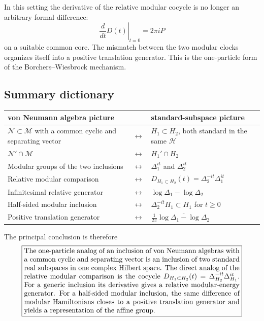 \documentclass[a4paper,11pt]{article}
\theoremstyle{definition}
\newcommand{\cH}{\mathcal{H}}
\begin{document}
In this setting the derivative of the relative modular cocycle is no
longer an arbitrary formal difference:
\[
\left.\frac{d}{dt}D(t)\right|_{t=0}
   =2\pi iP
\]
on a suitable common core.  The mismatch between the two modular clocks
organizes itself into a positive translation generator.  This is the
one-particle form of the Borchers--Wiesbrock mechanism.

\subsection*{Summary dictionary}

\renewcommand{\arraystretch}{1.45}
\setlength{\tabcolsep}{4pt}
\begin{center}
\begin{tabular}{>{\raggedright\arraybackslash}p{}
                >{\centering\arraybackslash}p{}
                >{\raggedright\arraybackslash}p{}}
\toprule
\textbf{von Neumann algebra picture}
& &
\textbf{standard-subspace picture}\\
\midrule
$\mathcal{N}\subset\mathcal{M}$ with a common cyclic and separating vector
& $\longleftrightarrow$ &
$H_1\subset H_2$, both standard in the same $\cH$\\
$\mathcal{N}'\cap\mathcal{M}$
& $\longleftrightarrow$ &
$H_1'\cap H_2$\\
Modular groups of the two inclusions
& $\longleftrightarrow$ &
$\Delta_1^{it}$ and $\Delta_2^{it}$\\
Relative modular comparison
& $\longleftrightarrow$ &
$D_{H_1\subset H_2}(t)=\Delta_2^{-it}\Delta_1^{it}$\\
Infinitesimal relative generator
& $\longleftrightarrow$ &
$\log\Delta_1-\log\Delta_2$\\
Half-sided modular inclusion
& $\longleftrightarrow$ &
$\Delta_2^{-it}H_1\subset H_1$ for $t\geq0$\\
Positive translation generator
& $\longleftrightarrow$ &
$\frac{1}{2\pi}\overline{\log\Delta_1-\log\Delta_2}$\\
\bottomrule
\end{tabular}
\end{center}

The principal conclusion is therefore
\[
\boxed{
\begin{minipage}{0.88\textwidth}
The one-particle analog of an inclusion of von Neumann algebras with a
common cyclic and separating vector is an inclusion of two standard real
subspaces in one complex Hilbert space.  The direct analog of the relative
modular comparison is the cocycle
$D_{H_1\subset H_2}(t)=\Delta_{H_2}^{-it}\Delta_{H_1}^{it}$.  For a generic inclusion its
derivative gives a relative modular-energy generator.  For a half-sided
modular inclusion, the same difference of modular Hamiltonians closes to
a positive translation generator and yields a representation of the
affine group.
\end{minipage}
}
\]
\end{document}

